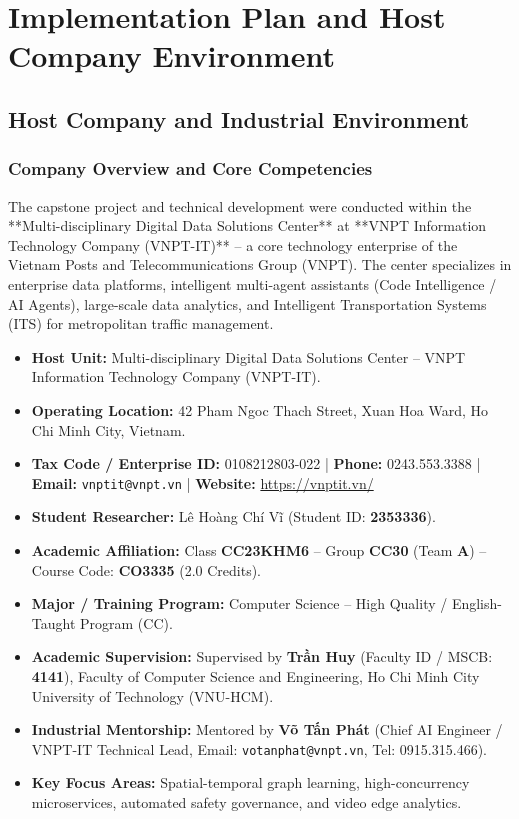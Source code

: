 \chapter{Implementation Plan and Host Company Environment}
\label{chapter:implementation}

\section{Host Company and Industrial Environment}

\subsection{Company Overview and Core Competencies}
The capstone project and technical development were conducted within the **Multi-disciplinary Digital Data Solutions Center** at **VNPT Information Technology Company (VNPT-IT)** -- a core technology enterprise of the Vietnam Posts and Telecommunications Group (VNPT). The center specializes in enterprise data platforms, intelligent multi-agent assistants (Code Intelligence / AI Agents), large-scale data analytics, and Intelligent Transportation Systems (ITS) for metropolitan traffic management.

\begin{itemize}[leftmargin=1.5cm, label=--]
  \item \textbf{Host Unit:} Multi-disciplinary Digital Data Solutions Center -- VNPT Information Technology Company (VNPT-IT).
  \item \textbf{Operating Location:} 42 Pham Ngoc Thach Street, Xuan Hoa Ward, Ho Chi Minh City, Vietnam.
  \item \textbf{Tax Code / Enterprise ID:} 0108212803-022 | \textbf{Phone:} 0243.553.3388 | \textbf{Email:} \texttt{vnptit@vnpt.vn} | \textbf{Website:} \url{https://vnptit.vn/}
  \item \textbf{Student Researcher:} Lê Hoàng Chí Vĩ (Student ID: \textbf{2353336}).
  \item \textbf{Academic Affiliation:} Class \textbf{CC23KHM6} -- Group \textbf{CC30} (Team \textbf{A}) -- Course Code: \textbf{CO3335} (2.0 Credits).
  \item \textbf{Major / Training Program:} Computer Science -- High Quality / English-Taught Program (CC).
  \item \textbf{Academic Supervision:} Supervised by \textbf{Trần Huy} (Faculty ID / MSCB: \textbf{4141}), Faculty of Computer Science and Engineering, Ho Chi Minh City University of Technology (VNU-HCM).
  \item \textbf{Industrial Mentorship:} Mentored by \textbf{Võ Tấn Phát} (Chief AI Engineer / VNPT-IT Technical Lead, Email: \texttt{votanphat@vnpt.vn}, Tel: 0915.315.466).
  \item \textbf{Key Focus Areas:} Spatial-temporal graph learning, high-concurrency microservices, automated safety governance, and video edge analytics.
\end{itemize}

